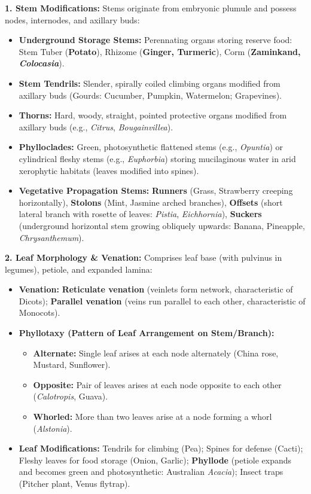 \documentclass[10pt,twoside,openright]{book}
\begin{document}
\begin{conceptbox}
\textbf{1. Stem Modifications:}
Stems originate from embryonic plumule and possess nodes, internodes, and axillary buds:
\begin{itemize}
  \item \textbf{Underground Storage Stems:} Perennating organs storing reserve food: Stem Tuber (\textbf{Potato}), Rhizome (\textbf{Ginger, Turmeric}), Corm (\textbf{Zaminkand, \textit{Colocasia}}).
  \item \textbf{Stem Tendrils:} Slender, spirally coiled climbing organs modified from axillary buds (Gourds: Cucumber, Pumpkin, Watermelon; Grapevines).
  \item \textbf{Thorns:} Hard, woody, straight, pointed protective organs modified from axillary buds (e.g., \textit{Citrus}, \textit{Bougainvillea}).
  \item \textbf{Phylloclades:} Green, photosynthetic flattened stems (e.g., \textit{Opuntia}) or cylindrical fleshy stems (e.g., \textit{Euphorbia}) storing mucilaginous water in arid xerophytic habitats (leaves modified into spines).
  \item \textbf{Vegetative Propagation Stems:} \textbf{Runners} (Grass, Strawberry creeping horizontally), \textbf{Stolons} (Mint, Jasmine arched branches), \textbf{Offsets} (short lateral branch with rosette of leaves: \textit{Pistia}, \textit{Eichhornia}), \textbf{Suckers} (underground horizontal stem growing obliquely upwards: Banana, Pineapple, \textit{Chrysanthemum}).
\end{itemize}

\textbf{2. Leaf Morphology \& Venation:}
Comprises leaf base (with pulvinus in legumes), petiole, and expanded lamina:
\begin{itemize}
  \item \textbf{Venation:} \textbf{Reticulate venation} (veinlets form network, characteristic of Dicots); \textbf{Parallel venation} (veins run parallel to each other, characteristic of Monocots).
  \item \textbf{Phyllotaxy (Pattern of Leaf Arrangement on Stem/Branch):}
  \begin{itemize}
    \item \textbf{Alternate:} Single leaf arises at each node alternately (China rose, Mustard, Sunflower).
    \item \textbf{Opposite:} Pair of leaves arises at each node opposite to each other (\textit{Calotropis}, Guava).
    \item \textbf{Whorled:} More than two leaves arise at a node forming a whorl (\textit{Alstonia}).
  \end{itemize}
  \item \textbf{Leaf Modifications:} Tendrils for climbing (Pea); Spines for defense (Cacti); Fleshy leaves for food storage (Onion, Garlic); \textbf{Phyllode} (petiole expands and becomes green and photosynthetic: Australian \textit{Acacia}); Insect traps (Pitcher plant, Venus flytrap).
\end{itemize}
\end{conceptbox}
\end{document}
